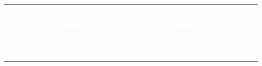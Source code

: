 \renewcommand*{\arraystretch}{1.25}
\begingroup
\small
{}
\begin{longtable}{|c|c|c|c|c|p{}|}
    \hline
    \rowcolor{gray}
    \textcolor{white}{\textbf{Address}} & \textcolor{white}{\textbf{Register Name}} & \textcolor{white}{\textbf{Width}} & \textcolor{white}{\textbf{Type}} & \textcolor{white}{\textbf{Reset Value}} & \textcolor{white}{\textbf{Description}} \\ \hline
    \endfirsthead

    \hline
    \rowcolor{gray}
    \textcolor{white}{\textbf{Address}} & \textcolor{white}{\textbf{Register Name}} & \textcolor{white}{\textbf{Width}} & \textcolor{white}{\textbf{Type}} & \textcolor{white}{\textbf{Reset Value}} & \textcolor{white}{\textbf{Description}} \\ \hline
    \endhead

    \hline
    \endfoot


\end{longtable}
